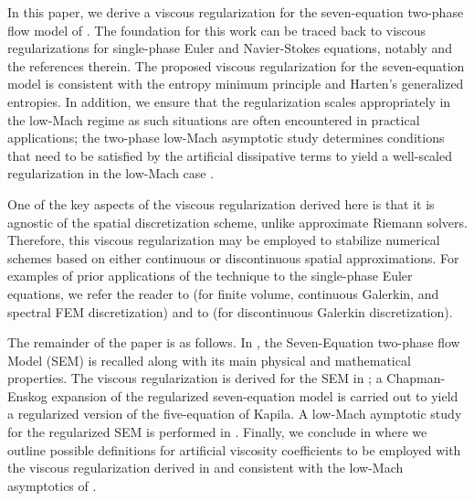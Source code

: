 \documentclass[preprint,10pt]{elsarticle}
\begin{document}
In this paper, we derive a viscous regularization for the seven-equation two-phase flow model of \cite{SEM}. The foundation for this work can be traced back to viscous regularizations for single-phase Euler and Navier-Stokes equations, notably \cite{jlg} and the references therein. The proposed viscous regularization for the seven-equation model is consistent with the entropy minimum principle and Harten's generalized entropies. In addition, we ensure that the regularization scales appropriately in the low-Mach regime as such situations are often encountered in practical applications; the two-phase low-Mach asymptotic study determines conditions that need to be satisfied by the artificial dissipative terms to yield a well-scaled regularization in the low-Mach case \cite{Marco_paper_low_mach}. 

One of the key aspects of the viscous regularization derived here is that it is agnostic of the spatial discretization scheme, unlike approximate Riemann solvers. Therefore, this viscous regularization may be employed to stabilize numerical schemes based on either continuous or discontinuous spatial approximations. For examples of prior applications of the technique to the single-phase Euler equations, we refer the reader to \cite{jlg} (for finite volume, continuous Galerkin, and spectral FEM discretization) and to \cite{valentin} (for discontinuous Galerkin discretization). 

The remainder of the paper is as follows. In , the Seven-Equation two-phase flow Model (SEM) is recalled along with its main physical and mathematical properties. The viscous regularization is derived for the SEM in ;  a Chapman-Enskog expansion of the regularized seven-equation model is carried out to yield a regularized version of the five-equation of Kapila.
A low-Mach aymptotic study for the regularized SEM is performed in . 
Finally, we conclude in  where we outline possible definitions for artificial viscosity coefficients to be employed with the viscous regularization derived in  and consistent with the low-Mach asymptotics of .
\end{document}
